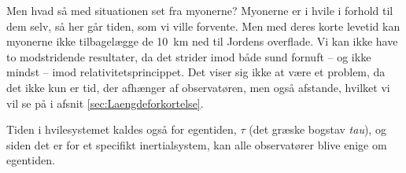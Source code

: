 Men hvad så med situationen set fra myonerne?
Myonerne er i hvile i forhold til dem selv, så her går tiden, som vi ville forvente.
Men med deres korte levetid kan myonerne ikke tilbagelægge de \SI{10}{\kilo\metre} ned til Jordens overflade.
Vi kan ikke have to modstridende resultater, da det strider imod både sund fornuft -- og ikke mindst -- imod relativitetsprincippet.
Det viser sig ikke at være et problem, da det ikke kun er tid, der afhænger af observatøren, men også afstande, hvilket vi vil se på i afsnit \ref{sec:Laengdeforkortelse}.

Tiden i hvilesystemet kaldes også for egentiden, $\tau$ (det græske bogstav \emph{tau}), og siden det er for et specifikt inertialsystem, kan alle observatører blive enige om egentiden. 